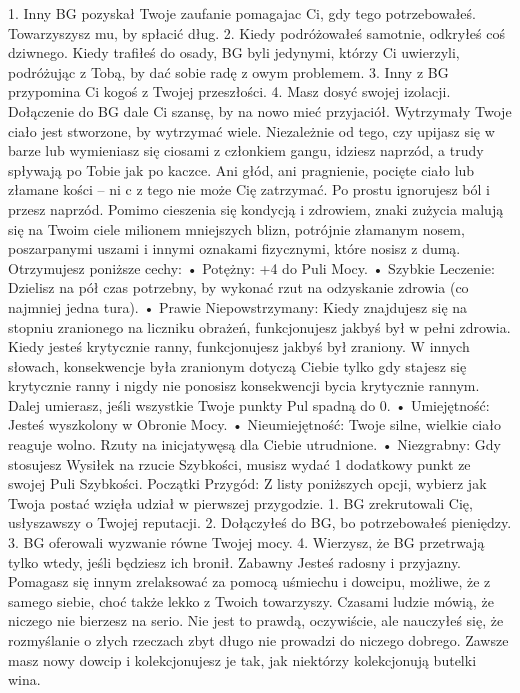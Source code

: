 1. Inny BG pozyskał Twoje zaufanie pomagajac Ci, gdy tego potrzebowałeś. Towarzyszysz mu, by spłacić dług.
2. Kiedy podróżowałeś samotnie, odkryłeś coś dziwnego. Kiedy trafiłeś do osady, BG byli jedynymi, którzy Ci uwierzyli, podróżując z Tobą, by dać sobie radę z owym problemem.
3. Inny z BG przypomina Ci kogoś z Twojej przeszłości.
4. Masz dosyć swojej izolacji. Dołączenie do BG dale Ci szansę, by na nowo mieć przyjaciół.
Wytrzymały
Twoje ciało jest stworzone, by wytrzymać wiele. Niezależnie od tego, czy upijasz się w barze lub wymieniasz się ciosami z członkiem gangu, idziesz naprzód, a trudy spływają po Tobie jak po kaczce. Ani głód, ani pragnienie, pocięte ciało lub złamane kości – ni c z tego nie może Cię zatrzymać. Po prostu ignorujesz ból i przesz naprzód. 
Pomimo cieszenia się kondycją i zdrowiem, znaki zużycia malują się na Twoim ciele milionem mniejszych blizn, potrójnie złamanym nosem, poszarpanymi uszami i innymi oznakami fizycznymi, które nosisz z dumą.
Otrzymujesz poniższe cechy:
    • Potężny: +4 do Puli Mocy.
    • Szybkie Leczenie: Dzielisz na pół czas potrzebny, by wykonać rzut na odzyskanie zdrowia (co najmniej jedna tura).
    • Prawie Niepowstrzymany: Kiedy znajdujesz się na stopniu zranionego na liczniku obrażeń, funkcjonujesz jakbyś był w pełni zdrowia. Kiedy jesteś krytycznie ranny, funkcjonujesz jakbyś był zraniony. W innych słowach, konsekwencje była zranionym dotyczą Ciebie tylko gdy stajesz się krytycznie ranny i nigdy nie ponosisz konsekwencji bycia krytycznie rannym. Dalej umierasz, jeśli wszystkie Twoje punkty Pul spadną do 0.
    • Umiejętność: Jesteś wyszkolony w Obronie Mocy.
    • Nieumiejętność: Twoje silne, wielkie ciało reaguje wolno. Rzuty na inicjatywęsą dla Ciebie utrudnione.
    • Niezgrabny: Gdy stosujesz Wysiłek na rzucie Szybkości, musisz wydać 1 dodatkowy punkt ze swojej Puli Szybkości.
Początki Przygód: Z listy poniższych opcji, wybierz jak Twoja postać wzięła udział w pierwszej przygodzie.
1. BG zrekrutowali Cię, usłyszawszy o Twojej reputacji.
2. Dołączyłeś do BG, bo potrzebowałeś pieniędzy.
3. BG oferowali wyzwanie równe Twojej mocy.
4. Wierzysz, że BG przetrwają tylko wtedy, jeśli będziesz ich bronił.
Zabawny
Jesteś radosny i przyjazny. Pomagasz się innym zrelaksować za pomocą uśmiechu i dowcipu, możliwe, że z samego siebie, choć także lekko z Twoich towarzyszy.  Czasami ludzie mówią, że niczego nie bierzesz na serio. Nie jest to prawdą, oczywiście, ale nauczyłeś się, że rozmyślanie o złych rzeczach zbyt długo nie prowadzi do niczego dobrego. Zawsze masz nowy dowcip i kolekcjonujesz je tak, jak niektórzy kolekcjonują butelki wina.
